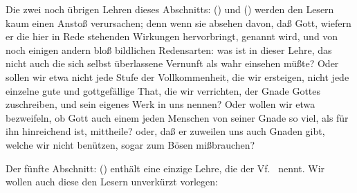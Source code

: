 Die zwei noch übrigen Lehren dieses Abschnitts:  () und  () werden den Lesern kaum einen Anstoß verursachen; denn wenn sie absehen davon, daß Gott, wiefern er die hier in Rede stehenden Wirkungen hervorbringt,  genannt wird, und von noch einigen andern bloß bildlichen Redensarten: was ist in dieser Lehre, das nicht auch die sich selbst überlassene Vernunft als wahr einsehen müßte? Oder sollen wir etwa nicht jede Stufe der Vollkommenheit, die wir ersteigen, nicht jede einzelne gute und gottgefällige That, die wir verrichten, der Gnade Gottes zuschreiben, und sein eigenes Werk in uns nennen? Oder wollen wir etwa bezweifeln, ob Gott auch einem jeden Menschen von seiner Gnade so viel, als für ihn hinreichend ist, mittheile? oder, daß er zuweilen uns auch Gnaden gibt, welche wir nicht benützen, sogar zum Bösen mißbrauchen? \usw\ \par
\gliederungslinie\par
Der fünfte Abschnitt:  () enthält eine einzige Lehre, die der Vf.\  nennt. Wir wollen auch diese den Lesern unverkürzt vorlegen: \par
